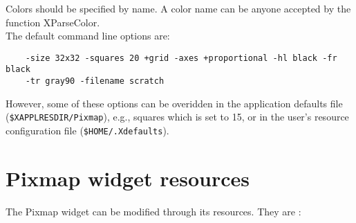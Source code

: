 \noindent
Colors should be specified by name. A color name can be anyone
accepted by the function XParseColor.\\

\noindent
The default command line options are:
\begin{verbatim} 
    -size 32x32 -squares 20 +grid -axes +proportional -hl black -fr black 
    -tr gray90 -filename scratch
\end{verbatim} 
However, some of these options can be overidden in the application
defaults file ({\tt \$XAPPLRESDIR/Pixmap}), e.g., squares
which is set to 15, or in the user's resource configuration file
({\tt \$HOME/.Xdefaults}). 

\section{Pixmap widget resources}
The Pixmap widget can be modified through its resources. They are :\\

